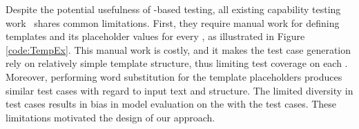 Despite the potential usefulness of \lc-based testing, all existing capability testing 
work~\cite{marcoACL2020checklist, rottger2020hatecheck} shares common limitations. First,
they require manual work for defining templates and its placeholder values for every \lcs, as illustrated in Figure \ref{code:TempEx}.
This manual work is costly, and it makes the test case generation rely on relatively simple template structure, thus limiting test coverage on each \lc. Moreover, performing word substitution for the template placeholders produces similar test cases with regard to input text and structure. The limited diversity in test cases results in bias in model evaluation on the \lc with the test cases.
These limitations motivated the design of our approach.